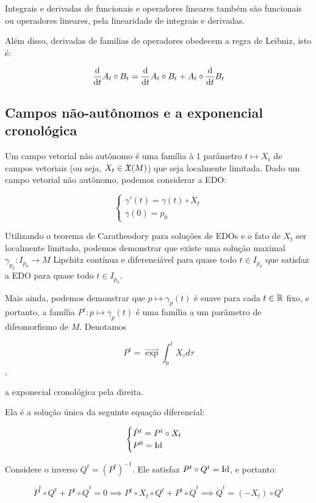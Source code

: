 Integrais e derivadas de funcionais e operadores lineares também são funcionais ou operadores
lineares, pela linearidade de integrais e derivadas.

Além disso, derivadas de familias de operadores obedecem a regra de Leibniz, isto é:

$$\frac{\text{d} }{\text{d} t} A_t \circ B_t = \frac{\text{d} }{\text{d} t} A_t \circ B_t + A_t \circ \frac{\text{d} }{\text{d} t}B_t$$

\subsection{Campos não-autônomos e a exponencial cronológica} 

Um campo vetorial não autônomo é uma família à $1$ parâmetro
$t \mapsto X_t$ de campos vetoriais (ou seja, $X_t \in \mathfrak{X}(M)$)
que seja localmente limitada.
Dado um campo vetorial não autônomo, podemos considerar a EDO:

$$\begin{cases}
    \gamma'(t) = \gamma(t) \circ X_t\\
    \gamma(0) = p_0
\end{cases}$$

Utilizando o teorema de Caratheodory para soluções de EDOs e
o fato de $X_t$ ser localmente limitado, podemos demonstrar
que existe uma solução maximal $\gamma_{p_0} : I_{p_0} \to M$
Lipchitz contínua e diferenciável para quase todo $t \in I_{p_0}$
que satisfaz a EDO para quase todo $t \in I_{p_0}$.

Mais ainda, podemos demonstrar que $p \mapsto \gamma_{p}(t)$ é suave
para cada $t \in \mathbb{R}$ fixo, e portanto,
a família $P^t: p \mapsto \gamma_p(t)$ é uma família a um parâmetro de difeomorfismo
de $M$. Denotamos

$$P^t = \overrightarrow{\exp} \int_0^t X_\tau d\tau$$,

a exponecial cronológica pela direita.

Ela é a solução única da seguinte equação diferencial:

$$\begin{cases}
    \dot{P}^t = P^t \circ X_t\\
    P^0 = \text{Id}
\end{cases}$$

Considere o inverso $Q^t = (P^t)^{-1}$. Ele satisfaz $P^t \circ Q^t = \text{Id}$, e portanto:

$$\dot{P}^t \circ Q^t + P^t \circ \dot{Q}^t = 0 \implies P^t \circ X_t \circ Q^t + P^t \circ \dot{Q}^t
\implies \dot{Q}^t = (-X_t) \circ Q^t$$

